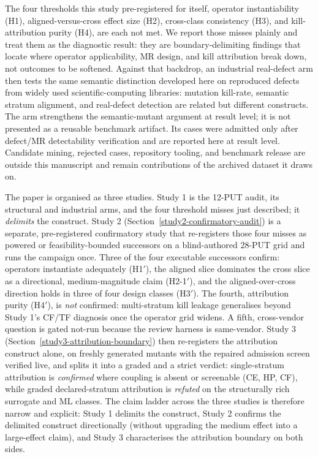\documentclass[manuscript,screen,review]{acmart}
\begin{document}
The four thresholds this study pre-registered for itself, operator
instantiability (H1), aligned-versus-cross effect size (H2), cross-class
consistency (H3), and kill-attribution purity (H4), are each not met. We
report those misses plainly and treat them as the diagnostic result:
they are boundary-delimiting findings that locate where operator
applicability, MR design, and kill attribution break down, not outcomes
to be softened. Against that backdrop, an industrial real-defect arm
then tests the same semantic distinction developed here on reproduced
defects from widely used scientific-computing libraries: mutation
kill-rate, semantic stratum alignment, and real-defect detection are
related but different constructs. The arm strengthens the semantic-mutant argument at result
level; it is not presented as a reusable benchmark artifact. Its cases
were admitted only after defect/MR detectability verification and are
reported here at result level. Candidate mining, rejected cases,
repository tooling, and benchmark release are outside this manuscript
and remain contributions of the archived dataset it draws on.

The paper is organised as three studies. Study 1 is the 12-PUT audit,
its structural and industrial arms, and the four threshold misses just
described; it \emph{delimits} the construct. Study 2
(Section~\ref{study2-confirmatory-audit}) is a separate, pre-registered
confirmatory study that re-registers those four misses as powered or
feasibility-bounded successors on a blind-authored 28-PUT grid and runs
the campaign once. Three of the four executable successors confirm:
operators instantiate adequately (H1\('\)), the aligned slice dominates
the cross slice as a directional, medium-magnitude claim (H2-1\('\)), and
the aligned-over-cross direction holds in three of four design classes
(H3\('\)). The fourth, attribution purity (H4\('\)), is \emph{not}
confirmed: multi-stratum kill leakage generalises beyond Study 1's
CF/TF diagnosis once the operator grid widens. A fifth, cross-vendor
question is gated not-run because the review harness is same-vendor.
Study 3 (Section~\ref{study3-attribution-boundary}) then re-registers the
attribution construct alone, on freshly generated mutants with the repaired
admission screen verified live, and splits it into a graded and a strict
verdict: single-stratum attribution is \emph{confirmed} where coupling is
absent or screenable (CE, HP, CF), while graded declared-stratum attribution
is \emph{refuted} on the structurally rich surrogate and ML classes.
The claim ladder across the three studies is therefore narrow and
explicit: Study 1 delimits the construct, Study 2 confirms the delimited
construct directionally (without upgrading the medium effect into a
large-effect claim), and Study 3 characterises the attribution boundary on
both sides.
\end{document}
